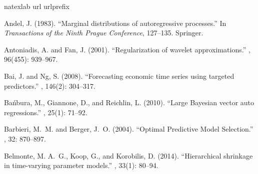 \documentclass[ba]{imsart}
\numberwithin{equation}{section}
\theoremstyle{plain}
\begin{document}





\begin{thebibliography}{70}
\newcommand{\enquote}[1]{``#1''}
\expandafter\ifx\csname natexlab\endcsname\relax\def\natexlab#1{#1}\fi
\expandafter\ifx\csname url\endcsname\relax
  \def\url#1{{\tt #1}}\fi
\expandafter\ifx\csname urlprefix\endcsname\relax\def\urlprefix{URL }\fi
\ifx\endbibitem\undefined \let\endbibitem\relax\fi

Andel, J. (1983).
\newblock \enquote{Marginal distributions of autoregressive processes.}
\newblock In {\em Transactions of the Ninth Prague Conference\/}, 127--135.
  Springer.
\endbibitem

Antoniadis, A. and Fan, J. (2001).
\newblock \enquote{Regularization of wavelet approximations.}
, 96(455):
  939--967.
\endbibitem

Bai, J. and Ng, S. (2008).
\newblock \enquote{Forecasting economic time series using targeted predictors.}
, 146(2): 304--317.
\endbibitem

Ba{\'n}bura, M., Giannone, D., and Reichlin, L. (2010).
\newblock \enquote{Large Bayesian vector auto regressions.}
, 25(1): 71--92.
\endbibitem

Barbieri, M.~M. and Berger, J.~O. (2004).
\newblock \enquote{Optimal Predictive Model Selection.}
, 32: 870--897.
\endbibitem

Belmonte, M. A.~G., Koop, G., and Korobilis, D. (2014).
\newblock \enquote{Hierarchical shrinkage in time-varying parameter models.}
, 33(1): 80--94.
\endbibitem


\end{thebibliography}
\end{document}
